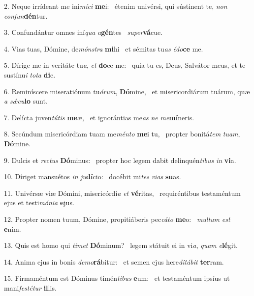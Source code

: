 2. Neque irrídeant me ini\textit{mí}\textit{ci} \textbf{me}i: \ast\  étenim univérsi, qui sústinent te, \textit{non} \textit{con}\textit{fun}\textbf{dén}tur.\

3. Confundántur omnes iní\textit{qua} \textit{a}\textbf{gén}tes \ast\  \textit{su}\textit{per}\textbf{vá}cue.\

4. Vias tuas, Dómine, de\textit{móns}\textit{tra} \textbf{mi}hi \ast\  et sémitas tu\textit{as} \textit{é}\textit{do}\textbf{ce} me.\

5. Dírige me in veritáte tu\textit{a}, \textit{et} \textbf{do}ce me: \ast\  quia tu es, Deus, Salvátor meus, et te sustínu\textit{i} \textit{to}\textit{ta} \textbf{di}e.\

6. Reminíscere miseratiónum tu\textit{á}\textit{rum}, \textbf{Dó}mine, \ast\  et misericordiárum tuárum, quæ \textit{a} \textit{sǽ}\textit{cu}\textbf{lo} sunt.\

7. Delícta juven\textit{tú}\textit{tis} \textbf{me}æ, \ast\  et ignorántias me\textit{as} \textit{ne} \textit{me}\textbf{mí}neris.\

8. Secúndum misericórdiam tuam me\textit{mén}\textit{to} \textbf{me}i tu, \ast\  propter bonitá\textit{tem} \textit{tu}\textit{am}, \textbf{Dó}mine.\

9. Dulcis et \textit{rec}\textit{tus} \textbf{Dó}minus: \ast\  propter hoc legem dabit delinquén\textit{ti}\textit{bus} \textit{in} \textbf{vi}a.\

10. Díriget mansuétos \textit{in} \textit{ju}\textbf{dí}cio: \ast\  docébit mi\textit{tes} \textit{vi}\textit{as} \textbf{su}as.\

11. Univérsæ viæ Dómini, misericórdi\textit{a} \textit{et} \textbf{vé}ritas, \ast\  requiréntibus testaméntum ejus et testi\textit{mó}\textit{ni}\textit{a} \textbf{e}jus.\

12. Propter nomen tuum, Dómine, propitiáberis pec\textit{cá}\textit{to} \textbf{me}o: \ast\  \textit{mul}\textit{tum} \textit{est} \textbf{e}nim.\

13. Quis est homo qui \textit{ti}\textit{met} \textbf{Dó}minum? \ast\  legem státuit ei in vi\textit{a}, \textit{quam} \textit{e}\textbf{lé}git.\

14. Anima ejus in bonis \textit{de}\textit{mo}\textbf{rá}bitur: \ast\  et semen ejus here\textit{di}\textit{tá}\textit{bit} \textbf{ter}ram.\

15. Firmaméntum est Dóminus timén\textit{ti}\textit{bus} \textbf{e}um: \ast\  et testaméntum ipsíus ut mani\textit{fes}\textit{té}\textit{tur} \textbf{il}lis.\

